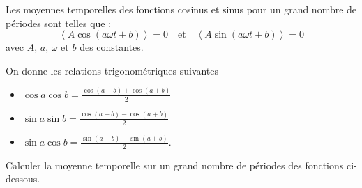                                 \initialisationPartieGauche %
\begin{minipage}{0.9\linewidth}
Les moyennes temporelles des fonctions cosinus et sinus pour un grand nombre de périodes sont telles que :
$$\left<A \cos(a \omega t + b)\right> = 0 \quad \text{et} \quad \left<A \sin(a \omega t + b)\right> = 0$$
avec $A$, $a$, $\omega$ et $b$ des constantes.
\end{minipage}
								\initialisationPartieDroite %
\begin{minipage}{0.9\linewidth}
On donne les relations trigonométriques suivantes
	\begin{itemize}
		\item $\cos a \cos b = \frac{\cos\left( a-b \right)+\cos\left( a+b \right) }{2}$
		\item $\sin a \sin b = \frac{\cos\left( a-b \right)-\cos\left( a+b \right) }{2}$
		\item $\sin a \cos b = \frac{\sin\left( a-b \right)-\sin\left( a+b \right) }{2}$.
	\end{itemize}
\end{minipage}
\finalisationDuPartageDePage %

Calculer la moyenne temporelle sur un grand nombre de périodes des fonctions ci-dessous.

\medskip

\debutEntrainement

